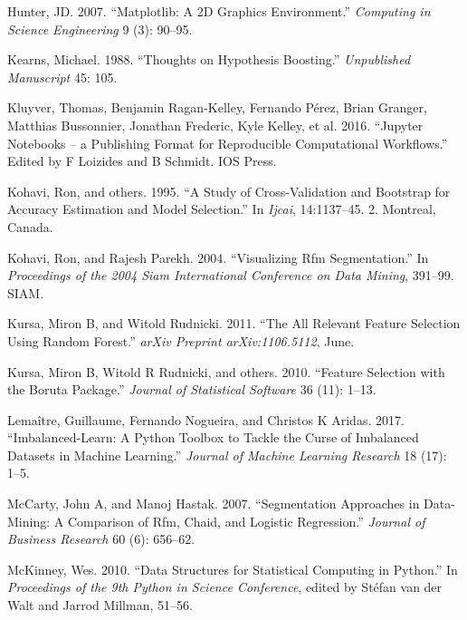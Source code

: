\documentclass[
  11pt,
  a4paper,
  DIV=12,captions=tableheading,oneside,titlepage]{scrbook}
\begin{document}
\leavevmode\hypertarget{ref-hunter2007matplotlib}{}%
Hunter, JD. 2007. ``Matplotlib: A 2D Graphics Environment.'' \emph{Computing in Science Engineering} 9 (3): 90--95.

\leavevmode\hypertarget{ref-kearns1988thoughts}{}%
Kearns, Michael. 1988. ``Thoughts on Hypothesis Boosting.'' \emph{Unpublished Manuscript} 45: 105.

\leavevmode\hypertarget{ref-Kluyver:2016aa}{}%
Kluyver, Thomas, Benjamin Ragan-Kelley, Fernando Pérez, Brian Granger, Matthias Bussonnier, Jonathan Frederic, Kyle Kelley, et al. 2016. ``Jupyter Notebooks -- a Publishing Format for Reproducible Computational Workflows.'' Edited by F Loizides and B Schmidt. IOS Press.

\leavevmode\hypertarget{ref-kohavi1995study}{}%
Kohavi, Ron, and others. 1995. ``A Study of Cross-Validation and Bootstrap for Accuracy Estimation and Model Selection.'' In \emph{Ijcai}, 14:1137--45. 2. Montreal, Canada.

\leavevmode\hypertarget{ref-kohavi2004visualizing}{}%
Kohavi, Ron, and Rajesh Parekh. 2004. ``Visualizing Rfm Segmentation.'' In \emph{Proceedings of the 2004 Siam International Conference on Data Mining}, 391--99. SIAM.

\leavevmode\hypertarget{ref-kursa2011boruta}{}%
Kursa, Miron B, and Witold Rudnicki. 2011. ``The All Relevant Feature Selection Using Random Forest.'' \emph{arXiv Preprint arXiv:1106.5112}, June.

\leavevmode\hypertarget{ref-kursa2010boruta}{}%
Kursa, Miron B, Witold R Rudnicki, and others. 2010. ``Feature Selection with the Boruta Package.'' \emph{Journal of Statistical Software} 36 (11): 1--13.

\leavevmode\hypertarget{ref-lemaitre2017imblearn}{}%
Lemaître, Guillaume, Fernando Nogueira, and Christos K Aridas. 2017. ``Imbalanced-Learn: A Python Toolbox to Tackle the Curse of Imbalanced Datasets in Machine Learning.'' \emph{Journal of Machine Learning Research} 18 (17): 1--5.

\leavevmode\hypertarget{ref-MCCARTY2007656}{}%
McCarty, John A, and Manoj Hastak. 2007. ``Segmentation Approaches in Data-Mining: A Comparison of Rfm, Chaid, and Logistic Regression.'' \emph{Journal of Business Research} 60 (6): 656--62.

\leavevmode\hypertarget{ref-mckinney-proc-scipy-2010}{}%
McKinney, Wes. 2010. ``Data Structures for Statistical Computing in Python.'' In \emph{Proceedings of the 9th Python in Science Conference}, edited by Stéfan van der Walt and Jarrod Millman, 51--56.
\end{document}
